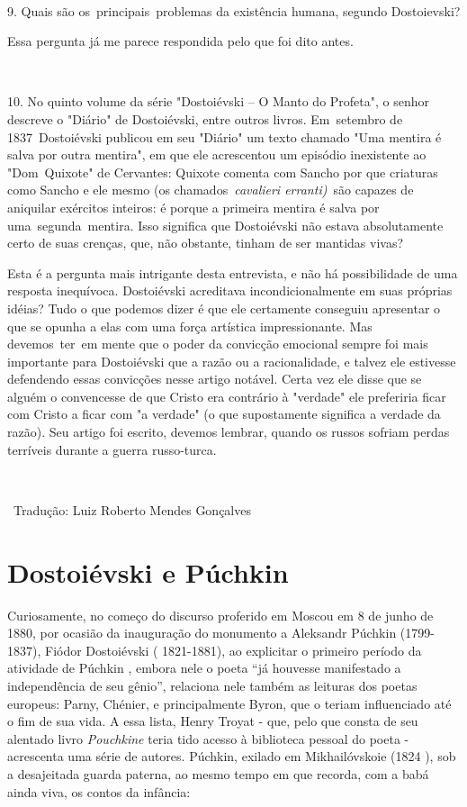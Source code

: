 ~

9. Quais são os~principais~problemas da existência humana, segundo
Dostoievski?

Essa pergunta já me parece respondida pelo que foi dito antes.

~

10. No quinto volume da série "Dostoiévski -- O Manto do Profeta", o
senhor descreve o "Diário" de Dostoiévski, entre outros livros.
Em~setembro de 1837~Dostoiévski publicou em seu "Diário" um texto
chamado "Uma mentira é salva por outra mentira", em que ele acrescentou
um episódio inexistente ao "Dom~Quixote" de Cervantes: Quixote comenta
com Sancho por que criaturas como Sancho e ele mesmo (os
chamados~\emph{cavalieri erranti)~}são capazes de aniquilar exércitos
inteiros: é porque a primeira mentira é salva por uma~segunda~mentira.
Isso significa que Dostoiévski não estava absolutamente certo de suas
crenças, que, não obstante, tinham de ser mantidas vivas?

Esta é a pergunta mais intrigante desta entrevista, e não há
possibilidade de uma resposta inequívoca. Dostoiévski acreditava
incondicionalmente em suas próprias idéias? Tudo o que podemos dizer é
que ele certamente conseguiu apresentar o que se opunha a elas com uma
força artística impressionante. Mas devemos~ter~em mente que o poder da
convicção emocional sempre foi mais importante para Dostoiévski que a
razão ou a racionalidade, e talvez ele estivesse defendendo essas
convicções nesse artigo notável. Certa vez ele disse que se alguém o
convencesse de que Cristo era contrário à "verdade" ele preferiria ficar
com Cristo a ficar com "a verdade" (o que supostamente significa a
verdade da razão). Seu artigo foi escrito, devemos lembrar, quando os
russos sofriam perdas terríveis durante a guerra russo-turca.

~

~Tradução: Luiz Roberto Mendes Gonçalves

\chapter{Dostoiévski e Púchkin}

Curiosamente, no começo do discurso proferido em Moscou em 8 de junho de
1880, por ocasião da inauguração do monumento a Aleksandr Púchkin
(1799-1837), Fiódor Dostoiévski ( 1821-1881), ao explicitar o primeiro
período da atividade de Púchkin , embora nele o poeta ``já houvesse
manifestado a independência de seu gênio'', relaciona nele também as
leituras dos poetas europeus: Parny, Chénier, e principalmente Byron,
que o teriam influenciado até o fim de sua vida. A essa lista, Henry
Troyat - que, pelo que consta de seu alentado livro \emph{Pouchkine}
teria tido acesso à biblioteca pessoal do poeta - acrescenta uma série
de autores. Púchkin, exilado em Mikhailóvskoie (1824 ), sob a
desajeitada guarda paterna, ao mesmo tempo em que recorda, com a babá
ainda viva, os contos da infância:

